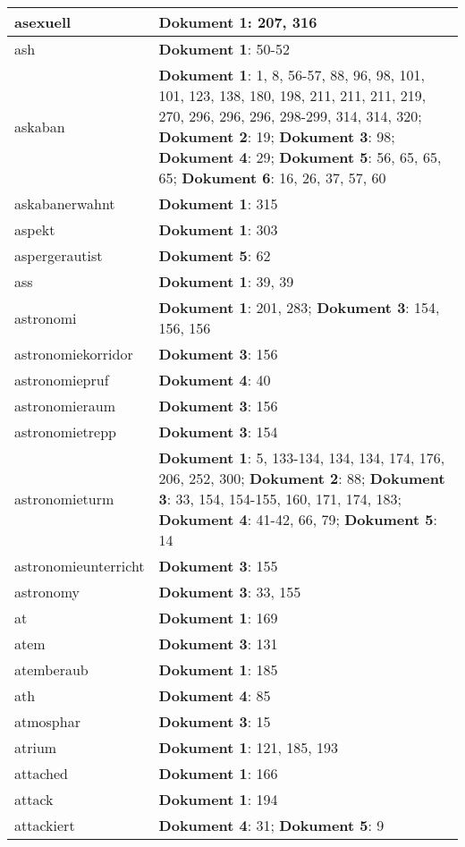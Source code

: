 \documentclass[a5paper]{article}
\begin{document}
\begin{longtable}[l]{|l|p{3in}|}
\hline
asexuell & \textbf{Dokument 1}: 207, 316 \\
\hline
ash & \textbf{Dokument 1}: 50-52 \\
\hline
askaban & \textbf{Dokument 1}: 1, 8, 56-57, 88, 96, 98, 101, 101, 123, 138, 180, 198, 211, 211, 211, 219, 270, 296, 296, 296, 298-299, 314, 314, 320; \textbf{Dokument 2}: 19; \textbf{Dokument 3}: 98; \textbf{Dokument 4}: 29; \textbf{Dokument 5}: 56, 65, 65, 65; \textbf{Dokument 6}: 16, 26, 37, 57, 60 \\
\hline
askabanerwahnt & \textbf{Dokument 1}: 315 \\
\hline
aspekt & \textbf{Dokument 1}: 303 \\
\hline
aspergerautist & \textbf{Dokument 5}: 62 \\
\hline
ass & \textbf{Dokument 1}: 39, 39 \\
\hline
astronomi & \textbf{Dokument 1}: 201, 283; \textbf{Dokument 3}: 154, 156, 156 \\
\hline
astronomiekorridor & \textbf{Dokument 3}: 156 \\
\hline
astronomiepruf & \textbf{Dokument 4}: 40 \\
\hline
astronomieraum & \textbf{Dokument 3}: 156 \\
\hline
astronomietrepp & \textbf{Dokument 3}: 154 \\
\hline
astronomieturm & \textbf{Dokument 1}: 5, 133-134, 134, 134, 174, 176, 206, 252, 300; \textbf{Dokument 2}: 88; \textbf{Dokument 3}: 33, 154, 154-155, 160, 171, 174, 183; \textbf{Dokument 4}: 41-42, 66, 79; \textbf{Dokument 5}: 14 \\
\hline
astronomieunterricht & \textbf{Dokument 3}: 155 \\
\hline
astronomy & \textbf{Dokument 3}: 33, 155 \\
\hline
at & \textbf{Dokument 1}: 169 \\
\hline
atem & \textbf{Dokument 3}: 131 \\
\hline
atemberaub & \textbf{Dokument 1}: 185 \\
\hline
ath & \textbf{Dokument 4}: 85 \\
\hline
atmosphar & \textbf{Dokument 3}: 15 \\
\hline
atrium & \textbf{Dokument 1}: 121, 185, 193 \\
\hline
attached & \textbf{Dokument 1}: 166 \\
\hline
attack & \textbf{Dokument 1}: 194 \\
\hline
attackiert & \textbf{Dokument 4}: 31; \textbf{Dokument 5}: 9 \\

\end{longtable}
\end{document}
